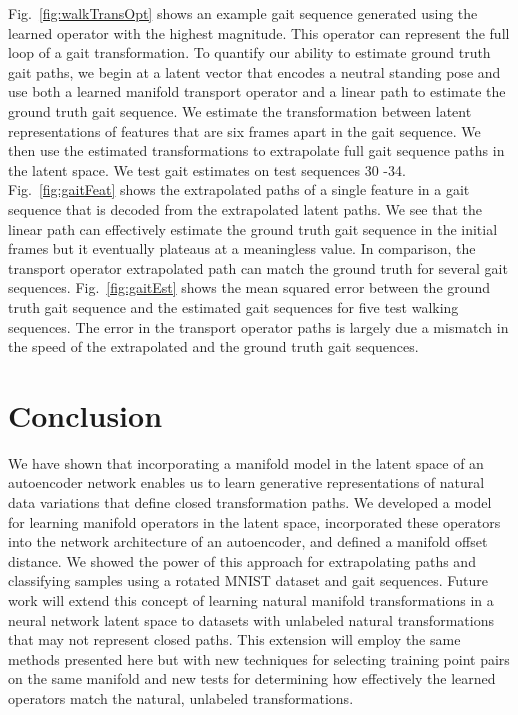 \documentclass[letterpaper]{article} %
\begin{document}
Fig.~\ref{fig:walkTransOpt} shows an example gait sequence generated using the learned operator with the highest magnitude. This operator can represent the full loop of a gait transformation. To quantify our ability to estimate ground truth gait paths, we begin at a latent vector that encodes a neutral standing pose and use both a learned manifold transport operator and a linear path to estimate the ground truth gait sequence. We estimate the transformation between latent representations of features that are six frames apart in the gait sequence. We then use the estimated transformations to extrapolate full gait sequence paths in the latent space. We test gait estimates on test sequences 30 -34. Fig.~\ref{fig:gaitFeat} shows the extrapolated paths of a single feature in a gait sequence that is decoded from the extrapolated latent paths. We see that the linear path can effectively estimate the ground truth gait sequence in the initial frames but it eventually plateaus at a meaningless value. In comparison, the transport operator extrapolated path can match the ground truth for several gait sequences.  Fig.~\ref{fig:gaitEst} shows the mean squared error between the ground truth gait sequence and the estimated gait sequences for five test walking sequences. The error in the transport operator paths is largely due a mismatch in the speed of the extrapolated and the ground truth gait sequences.



\section{Conclusion}

We have shown that incorporating a manifold model in the latent space of an autoencoder network enables us to learn generative representations of natural data variations that define closed transformation paths. We developed a model for learning manifold operators in the latent space, incorporated these operators into the network architecture of an autoencoder, and defined a manifold offset distance. We showed the power of this approach for extrapolating paths and classifying samples using a rotated MNIST dataset and gait sequences. Future work will extend this concept of learning natural manifold transformations in a neural network latent space to datasets with unlabeled natural transformations that may not represent closed paths. This extension will employ the same methods presented here but with new techniques for selecting training point pairs on the same manifold and new tests for determining how effectively the learned operators match the natural, unlabeled transformations. 
\end{document}
